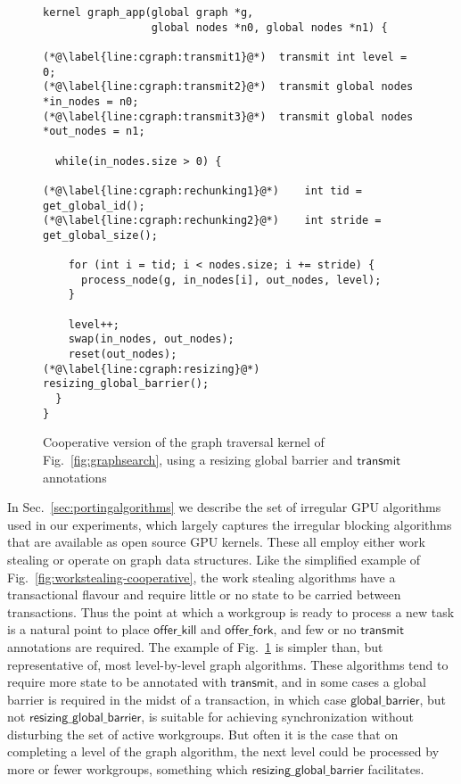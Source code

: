 \documentclass[numbers,nocopyrightspace,10pt]{sigplanconf}
\newcommand{\myfig}{Fig.~}
\newcommand{\mysec}{Sec.~}
\newcommand{\transmit}{\mathsf{transmit}}
\newcommand{\offerfork}{\mathsf{offer\_fork}}
\newcommand{\offerkill}{\mathsf{offer\_kill}}
\newcommand{\globalbarrier}{\mathsf{global\_barrier}}
\newcommand{\resizingglobalbarrier}{\mathsf{resizing\_global\_barrier}}
\begin{document}
\begin{figure}

\begin{lstlisting}
kernel graph_app(global graph *g, 
                 global nodes *n0, global nodes *n1) {

(*@\label{line:cgraph:transmit1}@*)  transmit int level = 0;
(*@\label{line:cgraph:transmit2}@*)  transmit global nodes *in_nodes = n0;
(*@\label{line:cgraph:transmit3}@*)  transmit global nodes *out_nodes = n1;

  while(in_nodes.size > 0) {

(*@\label{line:cgraph:rechunking1}@*)    int tid = get_global_id();
(*@\label{line:cgraph:rechunking2}@*)    int stride = get_global_size();

    for (int i = tid; i < nodes.size; i += stride) {
      process_node(g, in_nodes[i], out_nodes, level);
    }

    level++;
    swap(in_nodes, out_nodes);
    reset(out_nodes);
(*@\label{line:cgraph:resizing}@*)    resizing_global_barrier();
  }
}
\end{lstlisting}
\caption{Cooperative version of the graph traversal kernel of \myfig\ref{fig:graphsearch}, using a resizing global barrier and $\transmit$ annotations}\label{fig:cgraphsearch}
\end{figure}

In \mysec\ref{sec:portingalgorithms} we describe the set of irregular GPU algorithms used
in our experiments, which largely captures the irregular blocking
algorithms that are available as open source GPU kernels.  These all
employ either work stealing or operate on graph data structures.
Like the simplified example of \myfig\ref{fig:workstealing-cooperative}, the work stealing algorithms have a transactional flavour
and require little or no state to be carried between transactions.  Thus the point at which a workgroup is ready to process a new task is a natural point to place $\offerkill$ and $\offerfork$, and few or no $\transmit$ annotations are required.
%
The example of \myfig\ref{fig:cgraphsearch} is simpler than, but representative of,
most level-by-level graph algorithms.  These algorithms tend to
require more state to be annotated with $\transmit$, and in some cases
a global barrier is required in the midst of a transaction, in which
case $\globalbarrier$, but not $\resizingglobalbarrier$, is suitable
for achieving synchronization without disturbing the set of active
workgroups.  But often it is the case that on completing a level of
the graph algorithm, the next level could be processed by more or
fewer workgroups, something which $\resizingglobalbarrier$
facilitates.
\end{document}
